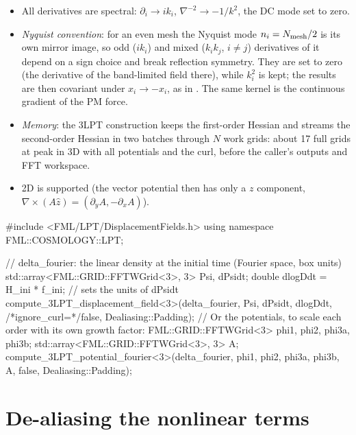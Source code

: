 \begin{implementation}
\begin{itemize}
\item All derivatives are spectral: $\partial_i\to ik_i$, $\nabla^{-2}\to-1/k^2$, the DC mode set to zero.
\item \emph{Nyquist convention}: for an even mesh the Nyquist mode $n_i=N_{\rm mesh}/2$ is its own mirror image, so
      odd ($ik_i$) and mixed ($k_ik_j$, $i\ne j$) derivatives of it depend on a sign choice and break reflection
      symmetry. They are set to zero (the derivative of the band-limited field there), while $k_i^2$ is kept; the
      results are then covariant under $x_i\to-x_i$, as in . The same kernel is the
      continuous gradient of the PM force.
\item \emph{Memory}: the 3LPT construction keeps the first-order Hessian and streams the second-order Hessian in two
      batches through $N$ work grids: about 17 full grids at peak in 3D with all potentials and the curl, before the
      caller's outputs and FFT workspace.
\item 2D is supported (the vector potential then has only a $z$ component, $\nabla\times(A\hat z)=(\partial_yA,-\partial_xA)$).
\end{itemize}
\end{implementation}

\begin{cppcode}
#include <FML/LPT/DisplacementFields.h>
using namespace FML::COSMOLOGY::LPT;

// delta_fourier: the linear density at the initial time (Fourier space, box units)
std::array<FML::GRID::FFTWGrid<3>, 3> Psi, dPsidt;
double dlogDdt = H_ini * f_ini;                          // sets the units of dPsidt
compute_3LPT_displacement_field<3>(delta_fourier, Psi, dPsidt, dlogDdt,
                                   /*ignore_curl=*/false, Dealiasing::Padding);
// Or the potentials, to scale each order with its own growth factor:
FML::GRID::FFTWGrid<3> phi1, phi2, phi3a, phi3b;  std::array<FML::GRID::FFTWGrid<3>, 3> A;
compute_3LPT_potential_fourier<3>(delta_fourier, phi1, phi2, phi3a, phi3b, A, false, Dealiasing::Padding);
\end{cppcode}

\section{De-aliasing the nonlinear terms}\label{sec:lpt-dealiasing}

